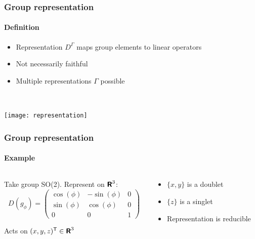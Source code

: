 \documentclass[english, fleqn]{beamer}
\begin{document}
\begin{frame}
    \frametitle{Group representation}
    \framesubtitle{Definition}

    \begin{itemize}
        \item Representation $D^\Gamma$ maps group elements to linear operators
        \item Not necessarily faithful
        \item Multiple representations $\Gamma$ possible
    \end{itemize}

    \

    \begin{center}
        \texttt{[image: representation]}
    \end{center}
\end{frame}

\begin{frame}
    \frametitle{Group representation}
    \framesubtitle{Example}
    
    \begin{columns}
        \begin{column}{.6\linewidth}
            Take group SO(2). Represent on $\text{\bfseries\sffamily{R}}^3$:
            \[
                D(g_\phi) =
                \begin{pmatrix}
                    \cos(\phi) & - \sin(\phi) & 0 \\
                    \sin(\phi) & \cos(\phi) & 0 \\
                    0 & 0 & 1
                \end{pmatrix}
            \]

            Acts on $(x, y, z)^\mathsf T \in \text{\bfseries\sffamily{R}}^3$
        \end{column}
        \pause
        \begin{column}{.4\linewidth}
            \begin{itemize}
                \item $\{ x, y \}$ is a doublet
                \item $\{ z \}$ is a singlet
                \item Representation is reducible
            \end{itemize}
        \end{column}
    \end{columns}
\end{frame}
\end{document}
